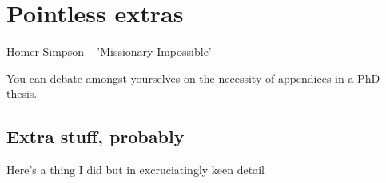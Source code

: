 \chapter{Pointless extras}
\label{app:Pointless}

%
{Homer Simpson -- 'Missionary Impossible'}

You can debate amongst yourselves on the necessity of appendices in a PhD thesis.

\section{Extra stuff, probably}
\label{app::Extras}
Here's a thing I did but in excruciatingly keen detail

%
